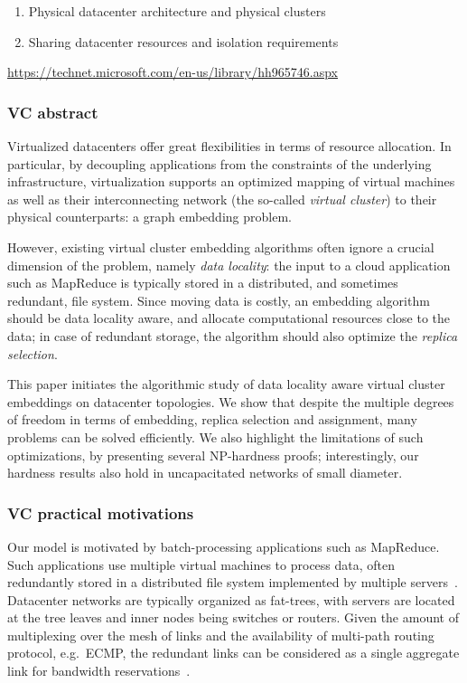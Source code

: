 
\begin{enumerate}
  \item Physical datacenter architecture and physical clusters
  \item Sharing datacenter resources and isolation requirements
\end{enumerate}

\url{https://technet.microsoft.com/en-us/library/hh965746.aspx}

\subsubsection{VC abstract}

Virtualized datacenters offer great flexibilities in terms of resource allocation. In particular, by
decoupling applications from the constraints of the underlying infrastructure, virtualization
supports an optimized mapping of virtual machines as well as their interconnecting network
 (the so-called \emph{virtual cluster})
to their
physical counterparts: a graph embedding problem.

However, existing virtual cluster embedding algorithms often ignore a crucial dimension of the problem, namely \emph{data locality}:
the input to a cloud application such as MapReduce is typically stored in a distributed,
and sometimes redundant, file system. Since moving
data is costly, an embedding algorithm should be data locality aware,
and allocate computational resources close to the data; in case of redundant storage, the algorithm should also optimize the \emph{replica selection}.

This paper initiates the algorithmic study of data locality aware virtual cluster embeddings
on datacenter topologies.
We
show that
despite the multiple degrees of freedom in terms of embedding, replica selection and assignment,
many problems can be
solved efficiently. We also highlight the limitations of such optimizations,
by presenting several NP-hardness proofs; interestingly,
our hardness results also hold in uncapacitated networks of small diameter.

\subsubsection{VC practical motivations}

Our model is motivated by batch-processing applications such as MapReduce.
Such applications use multiple virtual machines to
process data, often redundantly stored in a distributed file system implemented
by multiple servers~\cite{local-schedule-1,mapreduce}.
Datacenter networks are typically organized as fat-trees, with servers are
located at the tree leaves and inner nodes being switches or routers.
Given the amount of multiplexing over the mesh of links
and the availability of multi-path routing protocol, e.g.~ECMP, the redundant
links can be considered as a single aggregate link for bandwidth
reservations~\cite{oktopus,infocom16,ccr15emb,proteus}.


